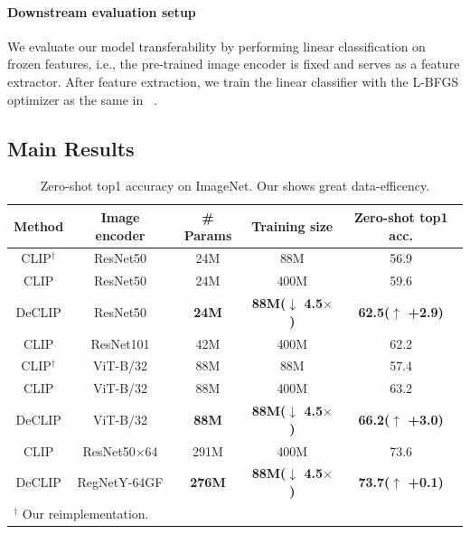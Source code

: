 \paragraph{Downstream evaluation setup}
We evaluate our model transferability by performing linear classification on frozen features, i.e., the pre-trained image encoder is fixed and serves as a feature extractor.
After feature extraction, we train the linear classifier with the L-BFGS optimizer as the same in ~\citet{radford2021learning}.

\subsection{Main Results}

\begin{table}[t]
\caption{\label{tab:zero-shot result} Zero-shot top1 accuracy on ImageNet. Our \workname shows great data-efficency.}
\begin{center}
\begin{footnotesize}
\begin{sc}
\begin{tabular}{ccccc}
   \toprule  
   \textbf{Method}         & \textbf{Image encoder} & \textbf{\# Params}  & \textbf{Training size}   & \textbf{Zero-shot top1 acc.} \\
   \midrule
   CLIP$^\dagger$         &ResNet50 &24M &88M &56.9	\\
   CLIP         &ResNet50 &24M &400M &59.6	\\
   DeCLIP       &ResNet50 & \textbf{24M} &\textbf{88M($\downarrow$ 4.5$\times$)} &\textbf{62.5($\uparrow$  +2.9)} 	\\
      CLIP         &ResNet101 &42M &400M &62.2	\\

   \midrule
   CLIP$^\dagger$         &ViT-B/32 &88M &88M &57.4	\\
   CLIP         &ViT-B/32 &88M &400M &63.2	\\
   DeCLIP       &ViT-B/32 &\textbf{88M} &\textbf{88M($\downarrow$ 4.5$\times$)} &\textbf{66.2($\uparrow$ +3.0)}	\\
  \midrule
  CLIP         &ResNet50$\times$64 &291M  &400M &73.6	\\
  DeCLIP       &RegNetY-64GF &\textbf{276M} &\textbf{88M($\downarrow$ 4.5$\times$)}  &\textbf{73.7($\uparrow$ +0.1)}	\\
  \bottomrule
  \multicolumn{5}{l}{$^\dagger$ Our reimplementation.}
\end{tabular}
\end{sc}
\end{footnotesize}
\end{center}
\end{table}

